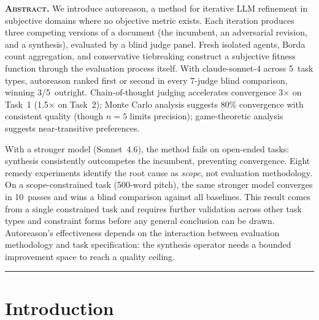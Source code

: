 \documentclass[10pt,twocolumn]{article}
\begin{document}

\noindent\textbf{\scshape Abstract.}\enspace
We introduce autoreason, a method for iterative LLM refinement in subjective domains where no objective metric exists. Each iteration produces three competing versions of a document (the incumbent, an adversarial revision, and a synthesis), evaluated by a blind judge panel. Fresh isolated agents, Borda count aggregation, and conservative tiebreaking construct a subjective fitness function through the evaluation process itself. With claude-sonnet-4 across 5~task types, autoreason ranked first or second in every 7-judge blind comparison, winning 3/5~outright. Chain-of-thought judging accelerates convergence 3$\times$ on Task~1 (1.5$\times$ on Task~2); Monte Carlo analysis suggests 80\% convergence with consistent quality (though $n{=}5$ limits precision); game-theoretic analysis suggests near-transitive preferences.

With a stronger model (Sonnet~4.6), the method fails on open-ended tasks: synthesis consistently outcompetes the incumbent, preventing convergence. Eight remedy experiments identify the root cause as \textit{scope}, not evaluation methodology. On a scope-constrained task (500-word pitch), the same stronger model converges in 10~passes and wins a blind comparison against all baselines. This result comes from a single constrained task and requires further validation across other task types and constraint forms before any general conclusion can be drawn. Autoreason's effectiveness depends on the interaction between evaluation methodology and task specification: the synthesis operator needs a bounded improvement space to reach a quality ceiling.

\vspace{6pt}
\hrule
\vspace{6pt}

\section{Introduction}
\end{document}
